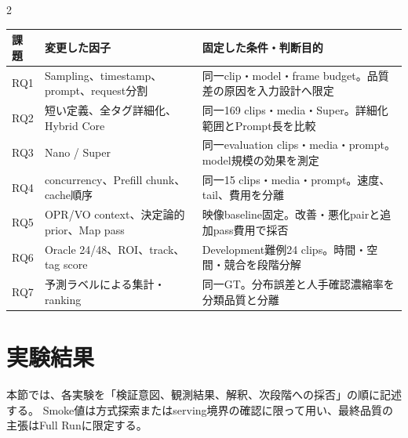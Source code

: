\documentclass[9pt,a4paper]{extarticle}
\begin{document}
\begin{multicols}{2}
\begin{center}
\label{tab:experiment-intent}
\scriptsize
\begin{tabularx}{\columnwidth}{l>{\raggedright\arraybackslash}X>{\raggedright\arraybackslash}X}
\toprule
課題 & 変更した因子 & 固定した条件・判断目的\\
\midrule
RQ1 & Sampling、timestamp、prompt、request分割 &
同一clip・model・frame budget。品質差の原因を入力設計へ限定\\
RQ2 & 短い定義、全タグ詳細化、Hybrid Core &
同一169 clips・media・Super。詳細化範囲とPrompt長を比較\\
RQ3 & Nano / Super &
同一evaluation clips・media・prompt。model規模の効果を測定\\
RQ4 & concurrency、Prefill chunk、cache順序 &
同一15 clips・media・prompt。速度、tail、費用を分離\\
RQ5 & OPR/VO context、決定論的prior、Map pass &
映像baseline固定。改善・悪化pairと追加pass費用で採否\\
RQ6 & Oracle 24/48、ROI、track、tag score &
Development難例24 clips。時間・空間・競合を段階分解\\
RQ7 & 予測ラベルによる集計・ranking &
同一GT。分布誤差と人手確認濃縮率を分類品質と分離\\
\bottomrule
\end{tabularx}
\end{center}

\section{実験結果}
本節では、各実験を「検証意図、観測結果、解釈、次段階への採否」の順に記述する。
Smoke値は方式探索またはserving境界の確認に限って用い、最終品質の主張はFull Runに限定する。

\end{multicols}
\end{document}
